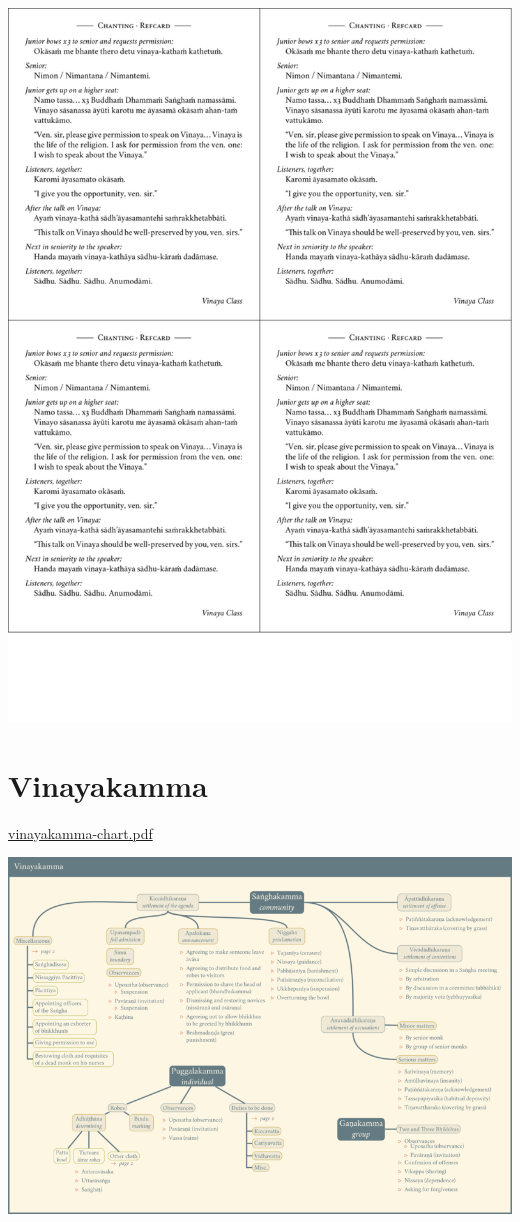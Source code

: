 \href{./includes/docs/chanting-refcard-4on1.pdf}{\includegraphics{./includes/docs/chanting-refcard-4on1-thumb.png}}

\section{Vinayakamma}

\href{./includes/docs/vinayakamma-chart.pdf}{vinayakamma-chart.pdf}

\href{./includes/docs/vinayakamma-chart.pdf}{\includegraphics{./includes/docs/vinayakamma-chart-thumb.png}}

